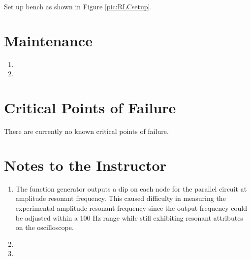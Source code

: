 Set up bench as shown in Figure \ref{pic:RLCsetup}.

\section{Maintenance}

\begin{enumerate}
\item 
\item 
\end{enumerate}

\section{Critical Points of Failure}

There are currently no known critical points of failure.

\section{Notes to the Instructor}
\begin{enumerate}
\item The function generator outputs a dip on each node for the parallel circuit at amplitude resonant frequency. This caused difficulty in measuring the experimental amplitude resonant frequency since the output frequency could be adjusted within a 100 Hz range while still exhibiting resonant attributes on the oscilloscope. 
\item 
\item 
\end{enumerate}

